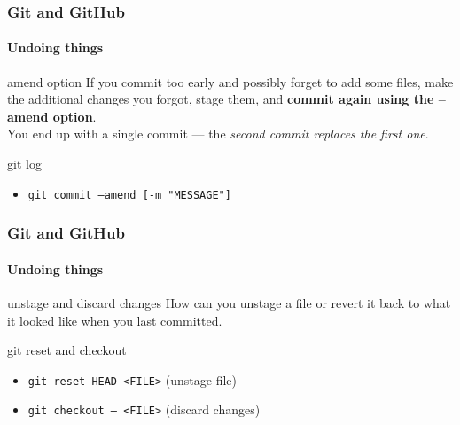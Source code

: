 
\begin{frame}
	\frametitle{Git and GitHub}
    \framesubtitle{Undoing things}
    \addtocounter{nframe}{1}

	\begin{block}{amend option}
		If you commit too early and possibly forget to add some files, make the additional changes you forgot, stage them, and \textbf{commit again using the --amend option}.
		\\ You end up with a single commit — the \textit{second commit replaces the first one}.
	\end{block}

	\begin{block}{git log}
		\begin{itemize}
			\item \texttt{git commit --amend [-m "MESSAGE"]}
		\end{itemize}
	\end{block}

\end{frame}

\begin{frame}
	\frametitle{Git and GitHub}
    \framesubtitle{Undoing things}
    \addtocounter{nframe}{1}

	\begin{block}{unstage and discard changes}
		How can you unstage a file or revert it back to what it looked like when you last committed.
	\end{block}

	\begin{block}{git reset and checkout}
		\begin{itemize}
			\item \texttt{git reset HEAD <FILE>} (unstage file)
			\item \texttt{git checkout -- <FILE>} (discard changes)
		\end{itemize}
	\end{block}

\end{frame}

